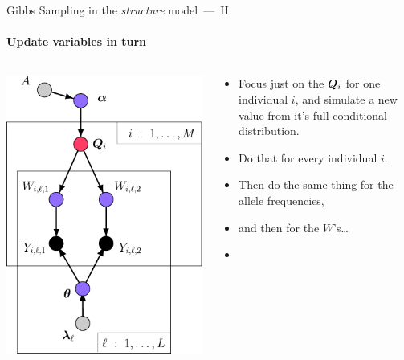 \documentclass[letter,graphicx]{beamer}
\def\bm#1{\mathpalette\bmstyle{#1}}
\def\bmstyle#1#2{\mbox{\boldmath$#1#2$}}
\begin{document}
\begin{frame}{Gibbs Sampling in the {\em structure} model~---~II}
\framesubtitle{Update variables in turn}
\begin{columns}
    \begin{column}{0.41\textwidth}
        \includegraphics[width=1.0\textwidth]{../diagrams/PritchSimple2_purpQprime.pdf}
    \end{column}
    \begin{column}{0.59\textwidth}
    	\begin{itemize}
		\item Focus just on the $\bm{Q}_i$ for one individual $i$, and simulate a 
		new value from it's full conditional distribution.
		\item Do that for every individual $i$.
		\item Then do the same thing for the allele frequencies,
		\item and then for the $W$'s\ldots
		\item {}
        \end{itemize}
    \end{column}
\end{columns}
\end{frame}
\end{document}
